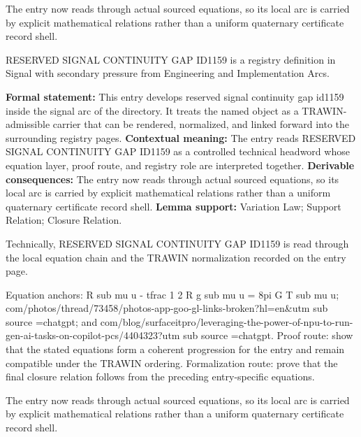 The entry now reads through actual sourced equations, so its local arc is carried by explicit mathematical relations rather than a uniform quaternary certificate record shell.
\clearpage


\begingroup\small
{}
RESERVED SIGNAL CONTINUITY GAP ID1159 is a registry definition in Signal with secondary pressure from Engineering and Implementation Arcs.

\begingroup\footnotesize\setlength{\emergencystretch}{3em}\sloppy
\textbf{Formal statement:} This entry develops reserved signal continuity gap id1159 inside the signal arc of the directory. It treats the named object as a TRAWIN-admissible carrier that can be rendered, normalized, and linked forward into the surrounding registry pages. \textbf{Contextual meaning:} The entry reads RESERVED SIGNAL CONTINUITY GAP ID1159 as a controlled technical headword whose equation layer, proof route, and registry role are interpreted together. \textbf{Derivable consequences:} The entry now reads through actual sourced equations, so its local arc is carried by explicit mathematical relations rather than a uniform quaternary certificate record shell. \textbf{Lemma support:} Variation Law; Support Relation; Closure Relation.\par
\endgroup

Technically, RESERVED SIGNAL CONTINUITY GAP ID1159 is read through the local equation chain and the TRAWIN normalization recorded on the entry page.

Equation anchors: R sub mu u - tfrac 1 2 R g sub mu u = 8pi G T sub mu u; com/photos/thread/73458/photos-app-goo-gl-links-broken?hl=en\&utm sub source =chatgpt; and com/blog/surfaceitpro/leveraging-the-power-of-npu-to-run-gen-ai-tasks-on-copilot-pcs/4404323?utm sub source =chatgpt. Proof route: show that the stated equations form a coherent progression for the entry and remain compatible under the TRAWIN ordering. Formalization route: prove that the final closure relation follows from the preceding entry-specific equations.

The entry now reads through actual sourced equations, so its local arc is carried by explicit mathematical relations rather than a uniform quaternary certificate record shell.
\endgroup

